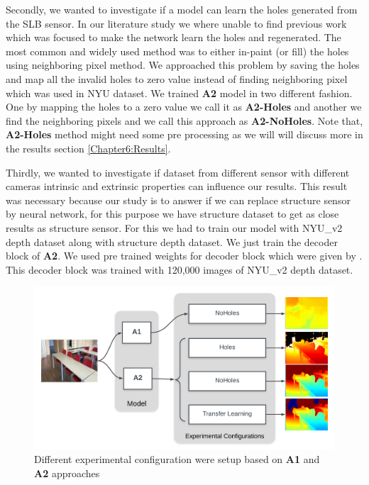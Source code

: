 Secondly, we wanted to investigate if a model can learn the holes generated from the SLB sensor. In our literature study we where unable to find previous work which was focused to make the network learn the holes and regenerated. The most common and widely used method was to either in-paint (or fill) the holes using neighboring pixel \cite{silberman11indoor} method. We approached this problem by saving the holes and map all the invalid holes to zero value instead of finding neighboring pixel which was used in NYU dataset. We trained \textbf{A2} model in two different fashion. One by mapping the holes to a zero value we call it as \textbf{A2-Holes} and another we find the neighboring pixels and we call this approach as \textbf{A2-NoHoles}. Note that, \textbf{A2-Holes} method might need some pre processing as we will will discuss more in the results section \ref{Chapter6:Results}.

Thirdly, we wanted to investigate if dataset from different sensor with different cameras intrinsic and extrinsic properties can influence our results. This result was necessary because our study is to answer if we can replace structure sensor by neural network, for this purpose we have structure dataset to get as close results as structure sensor. For this we had to train our model with NYU\_v2 depth dataset along with structure depth dataset. We just train the decoder block of \textbf{A2}. We used pre trained weights for decoder block which were given by \cite{Alhashim2018}. This decoder block was trained with 120,000 images of NYU\_v2 depth dataset.

\begin{figure}[h]
    \centering
    \includegraphics[width = 15cm]{Figures/config_setup.png}
    \caption{Different experimental configuration were setup based on \textbf{A1} and \textbf{A2} approaches}
    \label{fig:Experimental_Setup}
\end{figure}{}



